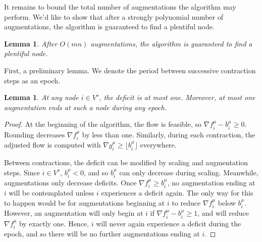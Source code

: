 \documentclass[11pt]{article}
\newtheorem{lemma}[theorem]{Lemma}
\theoremstyle{definition}
\theoremstyle{definition}
\theoremstyle{definition}
\newcommand{\fu}{f^{\mu}}
\newcommand{\nfiu}{\nabla \fu_i}
\newcommand{\biu}{b_{i}^{\mu}}
\newcommand{\vsrc}{V^{s}}
\begin{document}
    It remains to bound the total number of augmentations the algorithm may perform. We'd
    like to show that after a strongly polynomial number of augmentations, the algorithm
    is guaranteed to find a plentiful node.

    \begin{lemma} \label{lem.num-aug}
        After $O(mn)$ augmentations, the algorithm is guaranteed to find a plentiful node.
    \end{lemma}
    First, a preliminary lemma. We denote the period between successive contraction
    steps as an epoch.
    \begin{lemma} \label{lem:deficit-bound}
    At any node $i \in \vsrc$, the deficit is at most one. Moreover, at most one augmentation
    ends at such a node during any epoch.
    \end{lemma}
    \begin{proof}
        At the beginning of the algorithm, the flow is feasible, so $\nfiu - \biu \geq 0$.
        Rounding decreases $\nfiu$ by less than one. Similarly, during each contraction,
        the adjusted flow is computed with $\nabla g_i^\mu \geq \lfloor \biu \rfloor$ everywhere.

        Between contractions, the deficit can be modified by scaling and augmentation steps.
        Since $i \in \vsrc$, $\biu < 0$, and so $\biu$ can only decrease during scaling.
        Meanwhile, augmentations only decrease deficits.
        Once $\nfiu \geq \biu$, no augmentation ending at $i$ will be contemplated unless $i$
        experiences a deficit again. The only way for this to happen would be for
        augmentations beginning at $i$ to reduce $\nfiu$ below $\biu$. However,
        an augmentation will only begin at $i$ if
        $\nfiu - \biu \geq 1$, and will reduce $\nfiu$ by exactly one. Hence, $i$ will
        never again experience a deficit during the epoch, and so there will be no further
        augmentations ending at $i$.
    \end{proof}
\end{document}
